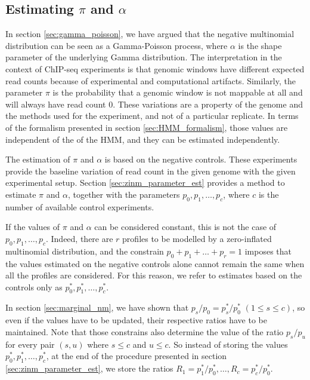 \documentclass[12pt]{article}
\begin{document}
\begin{appendices}
\subsection{Estimating $\pi$ and $\alpha$}

    In section \ref{sec:gamma_poisson}, we have argued that the
    negative multinomial distribution can be seen as a Gamma-Poisson
    process, where $\alpha$ is the shape parameter of the underlying
    Gamma distribution. The interpretation in the context of ChIP-seq
    experiments is that genomic windows have different expected
    read counts because of experimental and computational artifacts.
    Similarly, the parameter $\pi$ is the probability that a genomic
    window is not mappable at all and will always have read count 0.
    These variations are a property of the genome and the methods
    used for the experiment, and not of a particular replicate.
    In terms of the formalism presented in section
    \ref{sec:HMM_formalism}, those values are independent of the
    of the HMM, and they can be estimated independently.

    The estimation of $\pi$ and $\alpha$ is based on the negative
    controls. These experiments provide the baseline variation of
    read count in the given genome with the given experimental setup.
    Section \ref{sec:zinm_parameter_est} provides a method to
    estimate $\pi$ and $\alpha$, together with the parameters
    $p_0, p_1, \ldots, p_c$, where $c$ is the number of available
    control experiments.

    If the values of $\pi$ and $\alpha$ can be considered constant,
    this is not the case of $p_0, p_1, \ldots, p_c$. Indeed, there
    are $r$ profiles to be modelled by a zero-inflated multinomial
    distribution, and the constrain $p_0 + p_1 + \ldots + p_r = 1$
    imposes that the values estimated on the negative controls
    alone cannot remain the same when all the profiles are
    considered. For this reason, we refer to estimates based on the
    controls only as $p_0^*, p_1^*, \ldots, p_c^*$.

    In section \ref{sec:marginal_nm}, we have shown that
    $p_s/p_0 = p_s^*/p_0^*$ $(1 \leq s \leq c)$, so even if the
    values have to be updated, their respective ratios have to be
    maintained. Note that those constrains also determine the value
    of the ratio $p_s / p_u$ for every pair $(s,u)$ where $s \leq c$
    and $u \leq c$. So instead of storing the values
    $p_0^*, p_1^*, \ldots, p_c^*$, at the end of the procedure
    presented in section \ref{sec:zinm_parameter_est}, we store the
    ratios $R_1=p_1^*/p_0^*, \ldots, R_c=p_c^*/p_0^*$.


\end{appendices}
\end{document}
